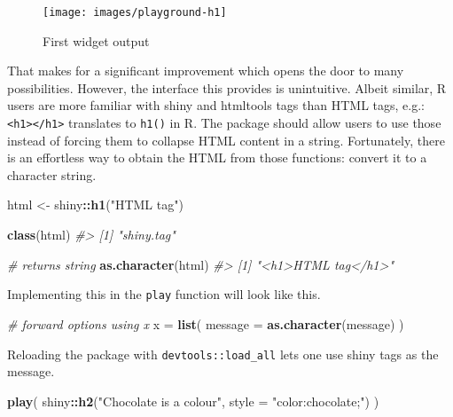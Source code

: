 \documentclass[
  10pt,
]{krantz}
\makeatletter
\newenvironment{Shaded}{\begin{snugshade}}{\end{snugshade}}
\newcommand{\CommentTok}[1]{\textcolor[rgb]{0.37,0.37,0.37}{\textit{#1}}}
\newcommand{\DataTypeTok}[1]{\textcolor[rgb]{0.27,0.27,0.27}{#1}}
\newcommand{\KeywordTok}[1]{\textcolor[rgb]{0.27,0.27,0.27}{\textbf{#1}}}
\newcommand{\NormalTok}[1]{#1}
\newcommand{\OperatorTok}[1]{\textcolor[rgb]{0.43,0.43,0.43}{\textbf{#1}}}
\newcommand{\StringTok}[1]{\textcolor[rgb]{0.5,0.5,0.5}{#1}}
\newenvironment{kframe}{%
\medskip{}
\setlength{\fboxsep}{.8em}
 \def\at@end@of@kframe{}%
 \ifinner\ifhmode%
  \def\at@end@of@kframe{\end{minipage}}%
  \begin{minipage}{\columnwidth}%
 \fi\fi%
 \def\FrameCommand##1{\hskip\@totalleftmargin \hskip-\fboxsep
 \colorbox{shadecolor}{##1}\hskip-\fboxsep
     \hskip-\linewidth \hskip-\@totalleftmargin \hskip\columnwidth}%
 \MakeFramed {\advance\hsize-\width
   \@totalleftmargin\z@ \linewidth\hsize
   \@setminipage}}%
 {\par\unskip\endMakeFramed%
 \at@end@of@kframe}
\renewenvironment{Shaded}{\begin{kframe}}{\end{kframe}}
\makeatother
\begin{document}
\begin{figure}[H]

{\centering \texttt{[image: images/playground-h1]} 

}

\caption{First widget output}\label{fig:playground-h1}
\end{figure}

That makes for a significant improvement which opens the door to many possibilities. However, the interface this provides is unintuitive. Albeit similar, R users are more familiar with shiny and htmltools \citep{R-htmltools} tags than HTML tags, e.g.: \texttt{\textless{}h1\textgreater{}\textless{}/h1\textgreater{}} translates to \texttt{h1()} in R. The package should allow users to use those instead of forcing them to collapse HTML content in a string. Fortunately, there is an effortless way to obtain the HTML from those functions: convert it to a character string.

\begin{Shaded}
\begin{Highlighting}[]
\NormalTok{html <{-}}\StringTok{ }\NormalTok{shiny}\OperatorTok{::}\KeywordTok{h1}\NormalTok{(}\StringTok{"HTML tag"}\NormalTok{)}

\KeywordTok{class}\NormalTok{(html)}
\CommentTok{\#> [1] "shiny.tag"}

\CommentTok{\# returns string}
\KeywordTok{as.character}\NormalTok{(html)}
\CommentTok{\#> [1] "<h1>HTML tag</h1>"}
\end{Highlighting}
\end{Shaded}

Implementing this in the \texttt{play} function will look like this.

\begin{Shaded}
\begin{Highlighting}[]
\CommentTok{\# forward options using x}
\NormalTok{x =}\StringTok{ }\KeywordTok{list}\NormalTok{(}
  \DataTypeTok{message =} \KeywordTok{as.character}\NormalTok{(message)}
\NormalTok{)}
\end{Highlighting}
\end{Shaded}

Reloading the package with \texttt{devtools::load\_all} lets one use shiny tags as the message.

\begin{Shaded}
\begin{Highlighting}[]
\KeywordTok{play}\NormalTok{(}
\NormalTok{  shiny}\OperatorTok{::}\KeywordTok{h2}\NormalTok{(}\StringTok{"Chocolate is a colour"}\NormalTok{, }\DataTypeTok{style =} \StringTok{"color:chocolate;"}\NormalTok{)}
\NormalTok{)}
\end{Highlighting}
\end{Shaded}
\end{document}
